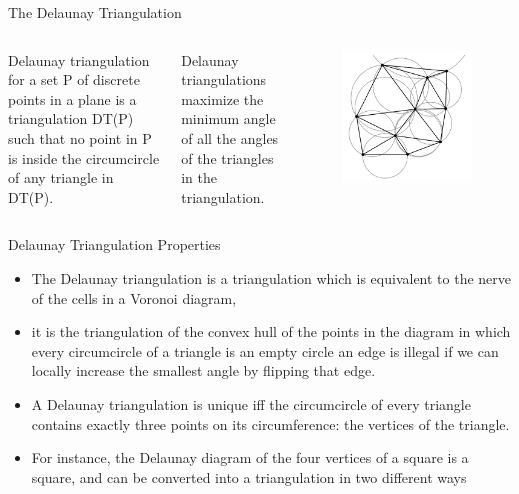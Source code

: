 \begin{frame}{The Delaunay Triangulation}
    \begin{columns}
        Delaunay triangulation for a set P of discrete
points in a plane is a triangulation DT(P)
such that no point in P is inside the
circumcircle of any triangle in DT(P).

Delaunay triangulations maximize the
minimum angle of all the angles of the
triangles in the triangulation.
        \begin{figure}
            \centering
            \includegraphics[width=\textwidth]{figs/L07-delaunay-triangulation.png}
        \end{figure}
    \end{columns}
\end{frame}

\begin{frame}{Delaunay Triangulation Properties}
\begin{itemize}
    \item The Delaunay triangulation is a triangulation which is equivalent to the
nerve of the cells in a Voronoi diagram,
    \item it is the triangulation of the convex hull of the points in the diagram in
which every circumcircle of a triangle is an empty circle
an edge is illegal if we can locally increase the smallest angle by flipping
that edge.
    \item A Delaunay triangulation is unique iff the circumcircle of every triangle
contains exactly three points on its circumference: the vertices of the
triangle.
    \item For instance, the Delaunay diagram of the four vertices of a square is a
square, and can be converted into a triangulation in two different ways
\end{itemize}
    
\end{frame}

